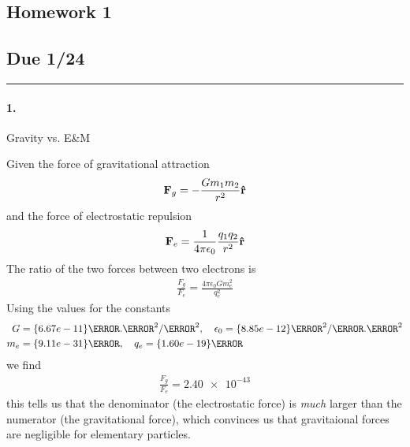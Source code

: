 \documentclass[../main.tex]{subfiles}
\begin{document}
\setcounter{section}{1}
\begin{center}
    \section*{Homework 1}
    \subsection*{Due 1/24}
\end{center}
\hrule \vspace{10px}

\paragraph{1.} Gravity vs. E\&M

Given the force of gravitational attraction
\begin{align*}
    \vb{F}_g = -\frac{G m_1 m_2}{r^2} \vu{r}
\end{align*}
and the force of electrostatic repulsion
\begin{align*}
    \vb{F}_e = \frac{1}{4 \pi \epsilon_0} \frac{q_1 q_2}{r^2} \vu{r}
\end{align*}
The ratio of the two forces between two electrons is
\begin{align*}
    \frac{F_g}{F_e} = \frac{4 \pi \epsilon_0 G m_e^2}{q_e^2}
\end{align*}
Using the values for the constants
\begin{align*}
    G &= \qty{6.67e-11}{\N.\m^2/\kg^2}, \quad \epsilon_0 = \qty{8.85e-12}{\C^2/\N.\m^2} \\
    m_e &= \qty{9.11e-31}{\kg}, \quad q_e = \qty{1.60e-19}{\C}
\end{align*}
we find
\begin{align*}
    \boxed{\frac{F_g}{F_e} = \num{2.40e-43}}
\end{align*}
this tells us that the denominator (the electrostatic force) is \emph{much} larger than the
numerator (the gravitational force), which convinces us that gravitaional forces are negligible
for elementary particles.
\end{document}
